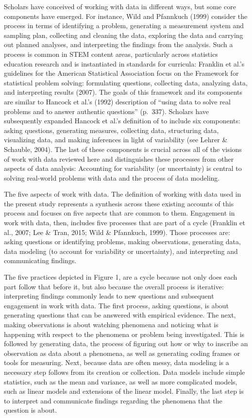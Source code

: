 \documentclass[]{msu-thesis}
\theoremstyle{definition}
\theoremstyle{definition}
\theoremstyle{definition}
\theoremstyle{remark}
\begin{document}
Scholars have conceived of working with data in different ways, but some
core components have emerged. For instance, Wild and Pfannkuch (1999)
consider the process in terms of identifying a problem, generating a
measurement system and sampling plan, collecting and cleaning the data,
exploring the data and carrying out planned analyses, and interpreting
the findings from the analysis. Such a process is common in STEM content
areas, particularly across statistics education research and is
instantiated in standards for curricula: Franklin et al.'s guidelines
for the American Statistical Association focus on the Framework for
statistical problem solving: formulating questions, collecting data,
analyzing data, and interpreting results (2007). The goals of this
framework and its components are similar to Hancock et al.'s (1992)
description of ``using data to solve real problems and to answer
authentic questions'' (p.~337). Scholars have subsequently expanded
Hancock et al.'s definition of to include six components: asking
questions, generating measures, collecting data, structuring data,
visualizing data, and making inferences in light of variability (see
Lehrer \& Schauble, 2004). The last of these components is crucial
across all of the visions of work with data reviewed here and
distinguishes these processes from other aspects of data analysis:
Accounting for variability (or uncertainty) is central to solving
real-world problems with data and the process of data modeling.

The five aspects of work with data. The definition of working with data
used in the present study represents a synthesis across these existing
accounts of this process and focuses on five aspects that are common to
them. Engagement in work with data, then, includes five processes that
are part of a cycle (Franklin et al., 2007; Lee \& Tran, 2015; Wild \&
Pfannkuch, 1999). Those processes are: asking questions or identifying
problems, making observations, generating data, data modeling (to
account for variability or uncertainty), and interpreting and
communicating findings.

The five practices depicted in Figure 1, are a cycle because not only
does each part follow that before it, but also because the overall
process is iterative: interpreting findings commonly leads to new
questions and subsequent engagement in work with data. The first
process, asking questions, is about generating questions that can be
answered with empirical evidence. The next, making observations is about
watching phenomena and noticing what is happening with respect to the
phenomena or problem being investigated. This is followed by generating
data, the process of figuring out how or why to inscribe an observation
as data about a phenomena, as well as generating coding frames or tools
for measuring. Next, because data are often messy, data modeling is a
necessary step follows from its creation or collection. Data models
include simple statistics, such as the mean and variance, as well as
more complicated models, such as linear models and extensions of the
linear model. Finally, the last step is to interpret and communicate
findings regarding the phenomena that the question is about.
\end{document}
